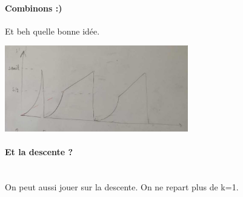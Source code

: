 \paragraph{Combinons :)}
\enspace
\begin{com}
	Et beh quelle bonne idée. 
\end{com}
\begin{center}
	\includegraphics[width = 8cm]{Developpements/TCP/schema3.jpeg} \\
\end{center}

\paragraph{Et la descente ?}
\enspace\\
On peut aussi jouer sur la descente. On ne repart plus de k=1. 